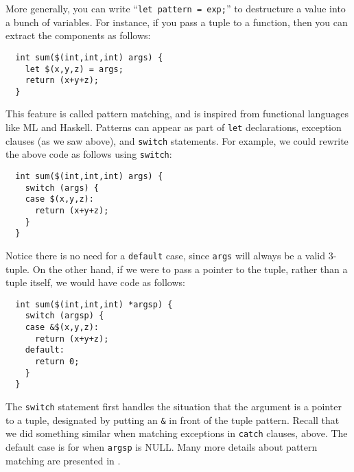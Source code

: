 More generally, you can write ``\texttt{let pattern = exp;}'' to
destructure a value into a bunch of variables.  For instance, if you
pass a tuple to a function, then you can extract the components as
follows:
\begin{verbatim}
  int sum($(int,int,int) args) {
    let $(x,y,z) = args;
    return (x+y+z);
  }
\end{verbatim}
This feature is called pattern matching, and is inspired from
functional languages like ML and Haskell.  Patterns can appear as part
of \texttt{let} declarations, exception clauses (as we saw above), and
\texttt{switch} statements.  For example, we could rewrite the above
code as follows using \texttt{switch}:
\begin{verbatim}
  int sum($(int,int,int) args) {
    switch (args) {
    case $(x,y,z):
      return (x+y+z);
    }
  }
\end{verbatim}
Notice there is no need for a \texttt{default} case, since
\texttt{args} will always be a valid 3-tuple.  On the other hand, if
we were to pass a pointer to the tuple, rather than a tuple itself, we
would have code as follows:
\begin{verbatim}
  int sum($(int,int,int) *argsp) {
    switch (argsp) {
    case &$(x,y,z):
      return (x+y+z);
    default:
      return 0;
    }
  }
\end{verbatim}
The \texttt{switch} statement first handles the situation that the
argument is a pointer to a tuple, designated by putting an \texttt{\&}
in front of the tuple pattern.  Recall that we did something similar
when matching exceptions in \texttt{catch} clauses, above.  The
default case is for when \texttt{argsp} is NULL.  Many more details
about pattern matching are presented in
.

